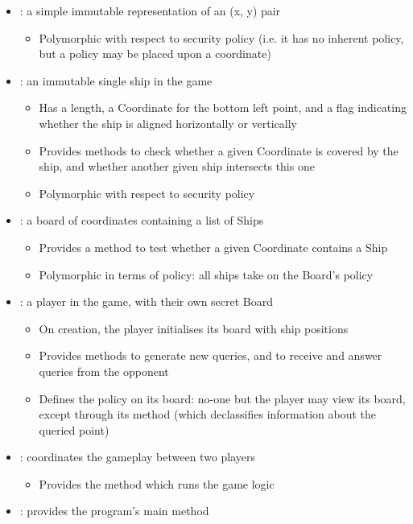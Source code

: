 \begin{itemize}
	\item {}: a simple immutable representation of an (x, y) pair
	
	\begin{itemize}
		\item Polymorphic with respect to security policy (i.e. it has no inherent policy, but a policy may be placed upon a coordinate)
	\end{itemize}
	
	\item {}: an immutable single ship in the game
	
	\begin{itemize}
		\item Has a length, a Coordinate for the bottom left point, and a flag indicating whether the ship is aligned horizontally or vertically
		
		\item Provides methods to check whether a given Coordinate is covered by the ship, and whether another given ship intersects this one
		
		\item Polymorphic with respect to security policy
	\end{itemize}
	
	\item {}: a board of coordinates containing a list of Ships
	
	\begin{itemize}

		\item Provides a method to test whether a given Coordinate contains a Ship
		
		\item Polymorphic in terms of policy: all ships take on the Board's policy
	\end{itemize}
	
	\item {}: a player in the game, with their own secret Board
	
	\begin{itemize}
		\item On creation, the player initialises its board with ship positions
		\item Provides methods to generate new queries, and to receive and answer queries from the opponent
		\item Defines the policy on its board: no-one but the player may view its board, except through its  method (which declassifies information about the queried point)
	\end{itemize}
	
	\item {}: coordinates the gameplay between two players
	
	\begin{itemize}
		\item Provides the method which runs the game logic
	\end{itemize}
	
	\item {}: provides the program's main method
\end{itemize}

